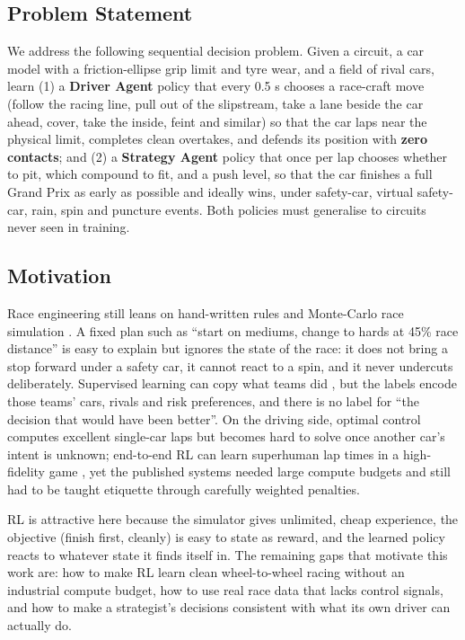 \documentclass{ieeeaccess}
\begin{document}
\subsection{Problem Statement}

We address the following sequential decision problem. Given a circuit, a car model
with a friction-ellipse grip limit and tyre wear, and a field of rival cars, learn
(1) a \textbf{Driver Agent} policy that every 0.5 s chooses a race-craft move (follow
the racing line, pull out of the slipstream, take a lane beside the car ahead,
cover, take the inside, feint and similar) so that the car laps near the
physical limit, completes clean overtakes, and defends its position with \textbf{zero
contacts}; and (2) a \textbf{Strategy Agent} policy that once per lap chooses whether
to pit, which compound to fit, and a push level, so that the car finishes a full
Grand Prix as early as possible and ideally wins, under safety-car, virtual
safety-car, rain, spin and puncture events. Both policies must generalise to
circuits never seen in training.

\subsection{Motivation}

Race engineering still leans on hand-written rules and Monte-Carlo race simulation
\cite{b8,b27}. A fixed plan such as ``start on mediums, change to hards at 45\% race
distance'' is easy to explain but ignores the state of the race: it does not bring
a stop forward under a safety car, it cannot react to a spin, and it never
undercuts deliberately. Supervised learning can copy what teams did \cite{b10}, but the
labels encode those teams' cars, rivals and risk preferences, and there is no
label for ``the decision that would have been better''. On the driving side, optimal
control computes excellent single-car laps \cite{b11,b12} but becomes hard to solve once
another car's intent is unknown; end-to-end RL can learn superhuman lap times in a
high-fidelity game \cite{b13,b14}, yet the published systems needed large compute
budgets and still had to be taught etiquette through carefully weighted penalties.

RL is attractive here because the simulator gives unlimited, cheap experience,
the objective (finish first, cleanly) is easy to state as reward, and the learned
policy reacts to whatever state it finds itself in. The remaining gaps that
motivate this work are: how to make RL learn clean wheel-to-wheel racing without an
industrial compute budget, how to use real race data that lacks control signals,
and how to make a strategist's decisions consistent with what its own driver can
actually do.
\end{document}
